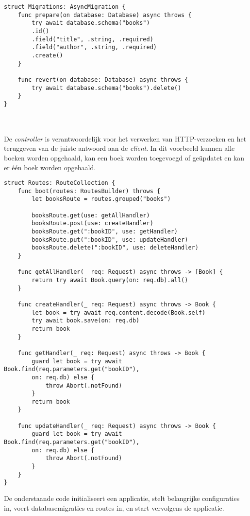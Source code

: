 \begin{lstlisting}[caption=Vapor example - Migrations]
struct Migrations: AsyncMigration {
    func prepare(on database: Database) async throws {
        try await database.schema("books")
        .id()
        .field("title", .string, .required)
        .field("author", .string, .required)
        .create()
    }
    
    func revert(on database: Database) async throws {
        try await database.schema("books").delete()
    }
}
\end{lstlisting}
\\  \\
De \textit{controller} is verantwoordelijk voor het verwerken van HTTP-verzoeken en het teruggeven van de juiste antwoord aan de \textit{client}. In dit voorbeeld kunnen alle boeken worden opgehaald, kan een boek worden toegevoegd of geüpdatet en kan er één boek worden opgehaald. 

\begin{lstlisting}[caption=Vapor example - Controller]
 struct Routes: RouteCollection {
    func boot(routes: RoutesBuilder) throws {
        let booksRoute = routes.grouped("books")
        
        booksRoute.get(use: getAllHandler)
        booksRoute.post(use: createHandler)
        booksRoute.get(":bookID", use: getHandler)
        booksRoute.put(":bookID", use: updateHandler)
        booksRoute.delete(":bookID", use: deleteHandler)
    }
    
    func getAllHandler(_ req: Request) async throws -> [Book] {
        return try await Book.query(on: req.db).all()
    }
    
    func createHandler(_ req: Request) async throws -> Book {
        let book = try await req.content.decode(Book.self)
        try await book.save(on: req.db)
        return book
    }
    
    func getHandler(_ req: Request) async throws -> Book {
        guard let book = try await Book.find(req.parameters.get("bookID"), 
        on: req.db) else {
            throw Abort(.notFound)
        }
        return book
    }
    
    func updateHandler(_ req: Request) async throws -> Book {
        guard let book = try await Book.find(req.parameters.get("bookID"), 
        on: req.db) else {
            throw Abort(.notFound)
        }
    }
}
\end{lstlisting}

De onderstaande code initialiseert een applicatie, stelt belangrijke configuraties in, voert databasemigraties en routes in, en start vervolgens de applicatie. 

